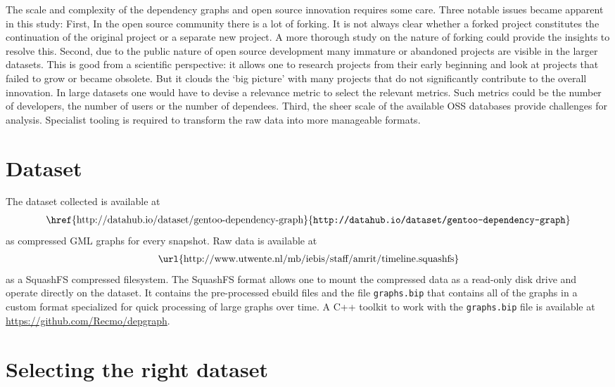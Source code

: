 \documentclass[smallextended,final]{svjour3}
\begin{document}
The scale and complexity of the dependency graphs and open source innovation requires some care. Three notable issues became apparent in this study: First, In the open source community there is a lot of forking. It is not always clear whether a forked project constitutes the continuation of the original project or a separate new project. A more thorough study on the nature of forking could provide the insights to resolve this. Second, due to the public nature of open source development many immature or abandoned projects are visible in the larger datasets. This is good from a scientific perspective: it allows one to research projects from their early beginning and look at projects that failed to grow or became obsolete. But it clouds the `big picture' with many projects that do not significantly contribute to the overall innovation. In large datasets one would have to devise a relevance metric to select the relevant metrics. Such metrics could be the number of developers, the number of users or the number of dependees. Third, the sheer scale of the available OSS databases provide challenges for analysis. Specialist tooling is required to transform the raw data into more manageable formats.





\appendix
\section{Dataset}

The dataset collected is available at
\begin{align}
\mbox{\href{http://datahub.io/dataset/gentoo-dependency-graph}{\texttt{http://datahub.io/dataset/gentoo-dependency-graph}}}
\end{align}
as compressed GML graphs for every snapshot. Raw data is available at
\begin{align}
\mbox{\url{http://www.utwente.nl/mb/iebis/staff/amrit/timeline.squashfs}}
\end{align}
as a SquashFS compressed filesystem. The SquashFS format allows one to mount the compressed data as a read-only disk drive and operate directly on the dataset. It contains the pre-processed ebuild files and the file \verb|graphs.bip| that contains all of the graphs in a custom format specialized for quick processing of large graphs over time. A C++ toolkit to work with the \verb|graphs.bip| file is available at \url{https://github.com/Recmo/depgraph}.

\section{Selecting the right dataset}
\end{document}

